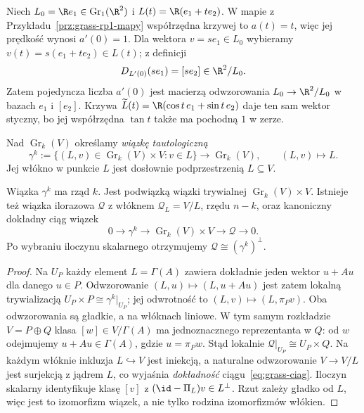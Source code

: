 \begin{przyklad}
Niech $L_0=\R e_1\in\operatorname{Gr}_1(\R^2)$ i
$L(t)=\R(e_1+t e_2)$. W mapie z
Przykładu~\ref{prz:grass-rp1-mapy}
współrzędna krzywej to $a(t)=t$, więc jej prędkość
wynosi $a'(0)=1$. Dla wektora $v=s e_1\in L_0$
wybieramy $v(t)=s(e_1+t e_2)\in L(t)$; z definicji
\[
 D_{L'(0)}(s e_1)=[s e_2]\in\R^2/L_0.
\]
Zatem pojedyncza liczba $a'(0)$ jest macierzą
odwzorowania $L_0\to\R^2/L_0$ w bazach
$e_1$ i $[e_2]$. Krzywa
$\widetilde L(t)=\R(\cos t\,e_1+\sin t\,e_2)$
daje ten sam wektor styczny, bo jej współrzędna
$\tan t$ także ma pochodną $1$ w zerze.
\end{przyklad}

\begin{definicja}
\label{def:grass-taut}
Nad $\operatorname{Gr}_k(V)$ określamy
\emph{wiązkę tautologiczną}
\[
 \gamma^k
 :=\{(L,v)\in\operatorname{Gr}_k(V)\times V:v\in L\}
 \longrightarrow\operatorname{Gr}_k(V),\qquad (L,v)\mapsto L.
\]
Jej włókno w punkcie $L$ jest dosłownie podprzestrzenią
$L\subseteq V$.
\end{definicja}

\begin{stwierdzenie}
\label{prop:grass-wiazki}
Wiązka $\gamma^k$ ma rząd $k$. Jest podwiązką
wiązki trywialnej $\operatorname{Gr}_k(V)\times V$.
Istnieje też wiązka ilorazowa $\mathcal Q$ z
włóknem $\mathcal Q_L=V/L$, rzędu $n-k$,
oraz kanoniczny dokładny ciąg wiązek
\begin{equation}\label{eq:grass-ciag}
 0\longrightarrow\gamma^k
 \longrightarrow\operatorname{Gr}_k(V)\times V
 \longrightarrow\mathcal Q\longrightarrow0.
\end{equation}
Po wybraniu iloczynu skalarnego otrzymujemy
$\mathcal Q\cong(\gamma^k)^\perp$.
\end{stwierdzenie}
\begin{proof}
Na $U_P$ każdy element $L=\Gamma(A)$ zawiera
dokładnie jeden wektor $u+Au$ dla danego $u\in P$.
Odwzorowanie $(L,u)\mapsto(L,u+Au)$ jest zatem lokalną
trywializacją $U_P\times P\cong\gamma^k|_{U_P}$;
jej odwrotność to $(L,v)\mapsto(L,\pi_Pv)$.
Oba odwzorowania są gładkie, a na włóknach liniowe.
W tym samym rozkładzie $V=P\oplus Q$ klasa
$[w]\in V/\Gamma(A)$ ma jednoznacznego
reprezentanta w $Q$: od $w$ odejmujemy
$u+Au\in\Gamma(A)$, gdzie $u=\pi_Pw$.
Stąd lokalnie $\mathcal Q|_{U_P}\cong U_P\times Q$.
Na każdym włóknie inkluzja $L\hookrightarrow V$
jest iniekcją, a naturalne odwzorowanie $V\to V/L$ jest
surjekcją z jądrem $L$, co wyjaśnia \emph{dokładność}
ciągu~\eqref{eq:grass-ciag}. Iloczyn skalarny
identyfikuje klasę $[v]$ z $(\id-\Pi_L)v\in L^\perp$.
Rzut zależy gładko od $L$, więc jest to izomorfizm wiązek,
a nie tylko rodzina izomorfizmów włókien.
\end{proof}


